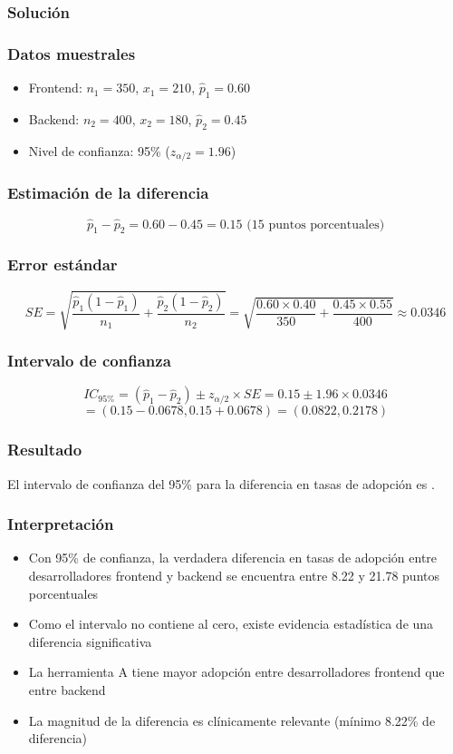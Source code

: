 \subsubsection*{Solución}

\subsubsection*{Datos muestrales}
\begin{itemize}
\item Frontend: $n_1 = 350$, $x_1 = 210$, $\hat{p}_1 = 0.60$
\item Backend: $n_2 = 400$, $x_2 = 180$, $\hat{p}_2 = 0.45$
\item Nivel de confianza: 95\% ($z_{\alpha/2} = 1.96$)
\end{itemize}

\subsubsection*{Estimación de la diferencia}
\[
\hat{p}_1 - \hat{p}_2 = 0.60 - 0.45 = 0.15 \text{ (15 puntos porcentuales)}
\]

\subsubsection*{Error estándar}
\[
SE = \sqrt{\frac{\hat{p}_1(1-\hat{p}_1)}{n_1} + \frac{\hat{p}_2(1-\hat{p}_2)}{n_2}} = \sqrt{\frac{0.60 \times 0.40}{350} + \frac{0.45 \times 0.55}{400}} \approx 0.0346
\]

\subsubsection*{Intervalo de confianza}
\[
IC_{95\%} = (\hat{p}_1 - \hat{p}_2) \pm z_{\alpha/2} \times SE = 0.15 \pm 1.96 \times 0.0346
\]
\[
= (0.15 - 0.0678, 0.15 + 0.0678) = (0.0822, 0.2178)
\]

\subsubsection*{Resultado}
El intervalo de confianza del 95\% para la diferencia en tasas de adopción es .

\subsubsection*{Interpretación}
\begin{itemize}
\item Con 95\% de confianza, la verdadera diferencia en tasas de adopción entre desarrolladores frontend y backend se encuentra entre 8.22 y 21.78 puntos porcentuales
\item Como el intervalo no contiene al cero, existe evidencia estadística de una diferencia significativa
\item La herramienta A tiene mayor adopción entre desarrolladores frontend que entre backend
\item La magnitud de la diferencia es clínicamente relevante (mínimo 8.22\% de diferencia)
\end{itemize}

